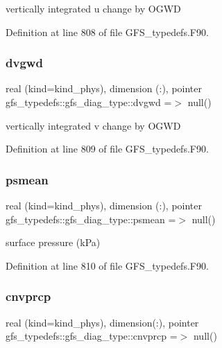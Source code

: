 vertically integrated u change by O\+G\+WD 



Definition at line 808 of file G\+F\+S\+\_\+typedefs.\+F90.

\mbox{\label{structgfs__typedefs_1_1gfs__diag__type_ab3946608ab8f0d1c5885e6064bcfcf89}} 
\subsubsection{dvgwd}
{\footnotesize\ttfamily real (kind=kind\+\_\+phys), dimension  (\+:), pointer gfs\+\_\+typedefs\+::gfs\+\_\+diag\+\_\+type\+::dvgwd =$>$ null()}



vertically integrated v change by O\+G\+WD 



Definition at line 809 of file G\+F\+S\+\_\+typedefs.\+F90.

\mbox{\label{structgfs__typedefs_1_1gfs__diag__type_aff2e7ac56f7b0ac95b1469bca27ca652}} 
\subsubsection{psmean}
{\footnotesize\ttfamily real (kind=kind\+\_\+phys), dimension (\+:), pointer gfs\+\_\+typedefs\+::gfs\+\_\+diag\+\_\+type\+::psmean =$>$ null()}



surface pressure (k\+Pa) 



Definition at line 810 of file G\+F\+S\+\_\+typedefs.\+F90.

\mbox{\label{structgfs__typedefs_1_1gfs__diag__type_a99fc14bc432fab23da91408b5e84e14d}} 
\subsubsection{cnvprcp}
{\footnotesize\ttfamily real (kind=kind\+\_\+phys), dimension(\+:), pointer gfs\+\_\+typedefs\+::gfs\+\_\+diag\+\_\+type\+::cnvprcp =$>$ null()}



